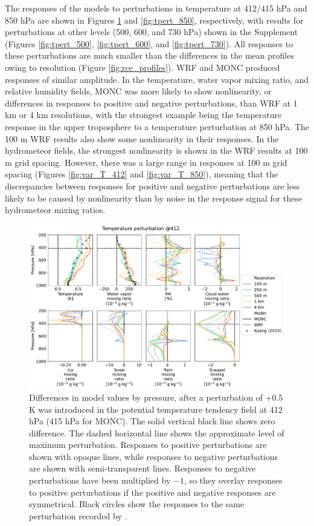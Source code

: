 \documentclass[draft]{agujournal2019}
\begin{document}
The responses of the models to perturbations in temperature at 412/415 hPa and
850 hPa are shown in Figures \ref{fig:tpert_412} and \ref{fig:tpert_850},
respectively, with results for perturbations at other levels (500, 600, and 730
hPa) shown in the Supplement (Figures \ref{fig:tpert_500}, \ref{fig:tpert_600},
and \ref{fig:tpert_730}). All responses to these perturbations are much smaller
than the differences in the mean profiles owing to resolution (Figure
\ref{fig:rce_profiles}). WRF and MONC produced responses of similar amplitude.
In the temperature, water vapor mixing ratio, and relative humidity fields, MONC
was more likely to show nonlinearity, or differences in responses to positive
and negative perturbations, than WRF at 1 km or 4 km resolutions, with the
strongest example being the temperature response in the upper troposphere to a
temperature perturbation at 850 hPa. The 100 m WRF results also show some
nonlinearity in their responses. In the hydrometeor fields, the strongest
nonlinearity is shown in the WRF results at 100 m grid spacing. However, there
was a large range in responses at 100 m grid spacing (Figures
\ref{fig:var_T_412} and \ref{fig:var_T_850}), meaning that the discrepancies
between responses for positive and negative perturbations are less likely to be
caused by nonlinearity than by noise in the response signal for these
hydrometeor mixing ratios.

\begin{figure}[pth]
    \noindent\includegraphics[width=\textwidth]{figures/pert_diffs_T_0.5_@412}
    \caption{Differences in model values by pressure, after a perturbation of
    +0.5 K was introduced in the potential temperature tendency field at 412 hPa
    (415 hPa for MONC). The solid vertical black line shows zero difference. The
    dashed horizontal line shows the approximate level of maximum perturbation.
    Responses to positive perturbations are shown with opaque lines, while
    responses to negative perturbations are shown with semi-transparent lines.
    Responses to negative perturbations have been multiplied by $-1$, so they
    overlay responses to positive perturbations if the positive and negative
    responses are symmetrical. Black circles show the responses to the same
    perturbation recorded by .}
    \label{fig:tpert_412}
\end{figure}
\end{document}
